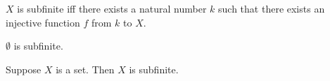 


\begin{definition}\label{subfinite}
    $X$ is subfinite iff
        there exists a natural number $k$ such that
        there exists an injective function $f$ from $k$ to $X$.
\end{definition}

\begin{proposition}\label{emptyset_subfinite}
    $\emptyset$ is subfinite.
\end{proposition}

\begin{proposition}\label{subfinite_universe}
  Suppose $X$ is a set. Then $X$ is subfinite.
\end{proposition}
